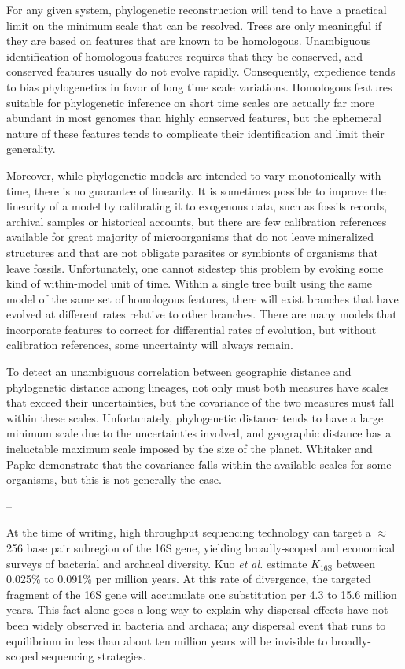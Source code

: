 For any given system, phylogenetic reconstruction will tend to have a practical limit on the minimum scale that can be resolved. Trees are only meaningful if they are based on features that are known to be homologous. Unambiguous identification of homologous features requires that they be conserved, and conserved features usually do not evolve rapidly. Consequently, expedience tends to bias phylogenetics in favor of long time scale variations. Homologous features suitable for phylogenetic inference on short time scales are actually far more abundant in most genomes than highly conserved features, but the ephemeral nature of these features tends to complicate their identification and limit their generality. 

Moreover, while phylogenetic models are intended to vary monotonically with time, there is no guarantee of linearity. It is sometimes possible to improve the linearity of a model by calibrating it to exogenous data, such as fossils records, archival samples or historical accounts, but there are few calibration references available for great majority of microorganisms that do not leave mineralized structures and that are not obligate parasites or symbionts of organisms that leave fossils. Unfortunately, one cannot sidestep this problem by evoking some kind of within-model unit of time. Within a single tree built using the same model of the same set of homologous features, there will exist branches that have evolved at different rates relative to other branches. There are many models that incorporate features to correct for differential rates of evolution, but without calibration references, some uncertainty will always remain.

To detect an unambiguous correlation between geographic distance and phylogenetic distance among lineages, not only must both measures have scales that exceed their uncertainties, but the covariance of the two measures must fall within these scales. Unfortunately, phylogenetic distance tends to have a large minimum scale due to the uncertainties involved, and geographic distance has a ineluctable maximum scale imposed by the size of the planet. Whitaker and Papke demonstrate that the covariance falls within the available scales for some organisms, but this is not generally the case.

--

At the time of writing, high throughput sequencing technology can target a $\approx$ 256 base pair subregion of the 16S gene, yielding broadly-scoped and economical surveys of bacterial and archaeal diversity. Kuo {\em et al.} estimate $K_{\mathrm{16S}}$ between 0.025\% to 0.091\% per million years. \cite{kuo2009inferring} At this rate of divergence, the targeted fragment of the 16S gene will accumulate one substitution per 4.3 to 15.6 million years. This fact alone goes a long way to explain why dispersal effects have not been widely observed in bacteria and archaea; any dispersal event that runs to equilibrium in less than about ten million years will be invisible to broadly-scoped sequencing strategies.

